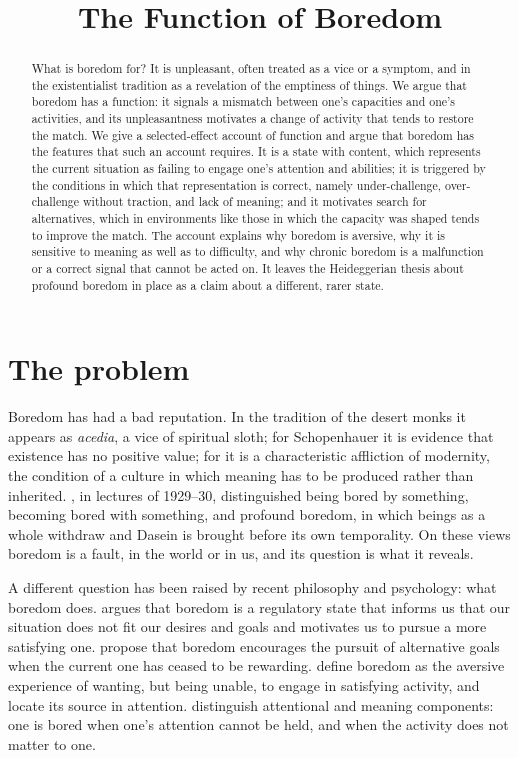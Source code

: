 \documentclass{situationist-preprint}
\title{The Function of Boredom}
\begin{document}
\maketitle

\begin{abstract}
What is boredom for? It is unpleasant, often treated as a vice or a symptom, and in the existentialist tradition as a revelation of the emptiness of things. We argue that boredom has a function: it signals a mismatch between one's capacities and one's activities, and its unpleasantness motivates a change of activity that tends to restore the match. We give a selected-effect account of function and argue that boredom has the features that such an account requires. It is a state with content, which represents the current situation as failing to engage one's attention and abilities; it is triggered by the conditions in which that representation is correct, namely under-challenge, over-challenge without traction, and lack of meaning; and it motivates search for alternatives, which in environments like those in which the capacity was shaped tends to improve the match. The account explains why boredom is aversive, why it is sensitive to meaning as well as to difficulty, and why chronic boredom is a malfunction or a correct signal that cannot be acted on. It leaves the Heideggerian thesis about profound boredom in place as a claim about a different, rarer state.
\end{abstract}

\section{The problem}

Boredom has had a bad reputation. In the tradition of the desert monks it appears as \emph{acedia}, a vice of spiritual sloth; for Schopenhauer it is evidence that existence has no positive value; for \citet{Svendsen2005} it is a characteristic affliction of modernity, the condition of a culture in which meaning has to be produced rather than inherited. \citet{Heidegger1995}, in lectures of 1929--30, distinguished being bored by something, becoming bored with something, and profound boredom, in which beings as a whole withdraw and Dasein is brought before its own temporality. On these views boredom is a fault, in the world or in us, and its question is what it reveals.

A different question has been raised by recent philosophy and psychology: what boredom does. \citet{Elpidorou2014, Elpidorou2018} argues that boredom is a regulatory state that informs us that our situation does not fit our desires and goals and motivates us to pursue a more satisfying one. \citet{BenchLench2013} propose that boredom encourages the pursuit of alternative goals when the current one has ceased to be rewarding. \citet{EastwoodEtAl2012} define boredom as the aversive experience of wanting, but being unable, to engage in satisfying activity, and locate its source in attention. \citet{WestgateWilson2018} distinguish attentional and meaning components: one is bored when one's attention cannot be held, and when the activity does not matter to one.
\end{document}
